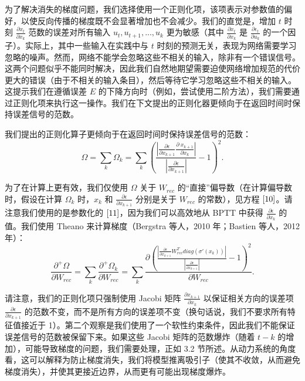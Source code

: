 为了解决消失的梯度问题，我们选择使用一个正则化项，该项表示对参数值的偏好，以使反向传播的梯度既不会显著增加也不会减少。我们的直觉是，增加 \(t\) 时刻 \(\frac{\partial x_t}{\partial x_k}\) 范数的误差对所有输入 \(u_t, u_{t+1}, ... ,u_k\) 更为敏感（其中 \(\frac{\partial x_t}{\partial x_k}\) 是 \(\frac{\partial\epsilon_t}{\partial u_k}\) 的一个因子）。实际上，其中一些输入在实践中与 \(t\) 时刻的预测无关，表现为网络需要学习忽略的噪声。然而，网络不能学会忽略这些不相关的输入，除非有一个错误信号。这两个问题似乎不能同时解决，因此我们自然地期望需要迫使网络增加规范的代价更大的错误（由于不相关的输入条目），然后等待它学习忽略这些不相关的输入。这提示我们在遵循误差 \(E\) 的下降方向时（例如，尝试使用二阶方法），我们需要通过正则化项来执行这一操作。我们在下文提出的正则化器更倾向于在返回时间时保持误差信号的范数。

我们提出的正则化算子更倾向于在返回时间时保持误差信号的范数：
\begin{equation}\label{9}
  \Omega = \sum_k\Omega_k = \sum_k\left(\frac{\left|\frac{\partial\epsilon}{\partial x_{k+1}}\frac{\partial\ x_{k+1}}{\partial x_k}\right|}{\left|\frac{\partial \epsilon}{\partial x_{k+1}}\right|} - 1\right)^2.
\end{equation}

为了在计算上更有效，我们仅使用 \(\Omega\) 关于 \(W_{rec}\) 的“直接”偏导数（在计算偏导数时，假设在计算 \(\Omega_k\) 时，\(x_k\) 和 \(\frac{\partial\epsilon}{\partial x_{k+1}}\) 分别是关于 \(W_{rec}\) 的常数），见方程 \(\eqref{10}\)。请注意我们使用的是参数化的 \(\eqref{11}\)，因为我们可以高效地从 BPTT 中获得 \(\frac{\partial\epsilon}{\partial x_k}\) 的值。我们使用 Theano 来计算梯度（Bergstra 等人，2010 年；Bastien 等人，2012 年）：
\begin{equation}\label{10}
  \frac{\partial^+\Omega}{\partial W_{rec}} = \sum_k\frac{\partial^+\Omega_k}{\partial W_{rec}} = \sum_k\frac{\partial\left(\frac{\left|\frac{\partial\epsilon}{\partial x_{k+1}}W_{rec}^T diag(\sigma '(x_k))\right|}{\left|\frac{\partial\epsilon}{\partial x_{k+1}}\right|} - 1\right)^2}{\partial W_{rec}}.
\end{equation}

请注意，我们的正则化项只强制使用 Jacobi 矩阵 \(\frac{\partial x_{k+1}}{\partial x_k}\) 以保证相关方向的误差项 \(\frac{\partial\epsilon}{\partial x_{k+1}}\) 的范数不变，而不是所有方向的误差项不变（换句话说，我们不要求所有特征值接近于 1）。第二个观察是我们使用了一个软性约束条件，因此我们不能保证误差信号的范数被保留下来。如果这些 Jacobi 矩阵的范数爆炸（随着 \(t-k\) 的增加），可能导致梯度的问题，我们需要处理，正如 3.2 节所述。从动力系统的角度看，这可以解释为防止梯度消失，我们将模型推离吸引子（使其不收敛，从而避免梯度消失），并使其更接近边界，从而更有可能出现梯度爆炸。

